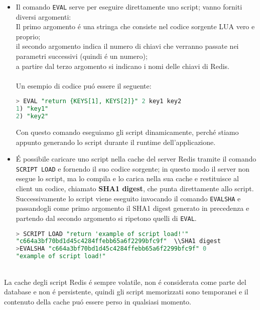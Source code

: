 \begin{itemize}
    \item Il comando \texttt{EVAL} serve per eseguire direttamente uno script; vanno forniti diversi argomenti:\\
    Il primo argomento é una stringa che consiste nel codice sorgente LUA vero e proprio;\\
    il secondo argomento indica il numero di chiavi che verranno passate nei parametri successivi (quindi é un numero);\\
    a partire dal terzo argomento si indicano i nomi delle chiavi di Redis.\\
      \\


    Un esempio di codice puó essere il seguente:
    \begin{lstlisting}[autogobble, style=redis-cli, language=SQL]
> EVAL "return {KEYS[1], KEYS[2]}" 2 key1 key2
1) "key1"
2) "key2"\end{lstlisting}
    Con questo comando eseguiamo gli script dinamicamente, perché stiamo appunto generando lo script durante il runtime dell'applicazione.
    \item É possibile caricare uno script nella cache del server Redis tramite il comando \texttt{SCRIPT LOAD} e fornendo il suo codice
    sorgente; in questo modo il server non esegue lo script, ma lo compila e lo carica nella sua cache e restituisce al client un codice, chiamato
    \textbf{SHA1 digest}, che punta direttamente allo script. Successivamente lo script viene eseguito invocando il comando \texttt{EVALSHA} e passandogli come
    primo argomento il SHA1 digest generato in precedenza e partendo dal secondo argomento si ripetono quelli di \texttt{EVAL}.

    \begin{lstlisting}[autogobble, style=redis-cli, language=SQL]
> SCRIPT LOAD "return 'example of script load!'"
"c664a3bf70bd1d45c4284ffebb65a6f2299bfc9f"  \\SHA1 digest
>EVALSHA "c664a3bf70bd1d45c4284ffebb65a6f2299bfc9f" 0
"example of script load!"\end{lstlisting}
\end{itemize}
\\
La cache degli script Redis é sempre volatile, non é considerata come parte del database e non é persistente, quindi gli script memorizzati
sono temporanei e il contenuto della cache puó essere perso in qualsiasi momento.